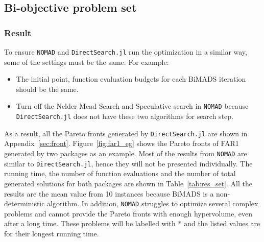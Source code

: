 \documentclass[11pt,oneside,onecolumn,openright]{article}
\begin{document}
\subsection{Bi-objective problem set}
\subsubsection{Result}
To ensure \verb|NOMAD| and \verb|DirectSearch.jl| run the optimization in a similar way, some of the settings must be the same. For example:
\begin{itemize}
  \item The initial point, function evaluation budgets for each BiMADS iteration should be the same.
  \item Turn off the Nelder Mead Search and Speculative search in \verb|NOMAD| because \verb|DirectSearch.jl| does not have these two algorithms for search step.
\end{itemize}

  As a result, all the Pareto fronts generated by \verb|DirectSearch.jl| are shown in Appendix~\ref{sec:front}. Figure~\ref{fig:far1_eg} shows the Pareto fronts of FAR1 generated by two packages as an example. Most of the results from \verb|NOMAD| are similar to \verb|DirectSearch.jl|, hence they will not be presented individually. The running time, the number of function evaluations and the number of total generated solutions for both packages are shown in Table~\ref{tab:res_set}. All the results are the mean value from 10 instances because BiMADS is a non-deterministic algorithm. In addition, \verb|NOMAD| struggles to optimize several complex problems and cannot provide the Pareto fronts with enough hypervolume, even after a long time. These problems will be labelled with $*$ and the listed values are for their longest running time.
\end{document}

